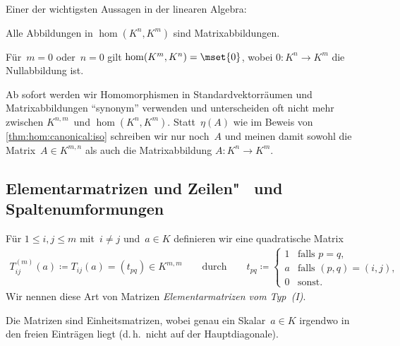 \documentclass[a4paper]{article}
\begin{document}
Einer der wichtigsten Aussagen in der linearen Algebra:

\begin{corollary}\label{cor:hommatrixiso}
    Alle Abbildungen in $\hom(K^n,K^m)$ sind Matrixabbildungen.

    Für~$m = 0$ oder~$n = 0$ gilt $\hom(K^m,K^n) = \mset{0}$, wobei $0\colon K^n \to K^m$ die Nullabbildung ist.
\end{corollary}

Ab sofort werden wir Homomorphismen in Standardvektorräumen und Matrixabbildungen "`synonym"' verwenden und unterscheiden oft nicht mehr zwischen $K^{n,m}$~und $\hom(K^n,K^m)$. Statt~$\eta(A)$ wie im Beweis von \cref{thm:hom:canonical:iso} schreiben wir nur noch~$A$ und meinen damit sowohl die Matrix~$A \in K^{m,n}$ als auch die Matrixabbildung $A\colon K^n \to K^m$.

\subsection{Elementarmatrizen und Zeilen"~ und Spaltenumformungen}

\begin{definition}
    Für $1 \leq i,j \leq m$ mit~$i \neq j$ und~$a \in K$ definieren wir eine quadratische Matrix
    \begin{gather*}
        T_{ij}^{(m)}(a) \coloneqq T_{ij}(a) = (t_{pq}) \in K^{m,m} \qquad\text{durch}\qquad t_{pq} \coloneqq \begin{cases}
            1 & \text{falls } p = q,         \\
            a & \text{falls } (p,q) = (i,j), \\
            0 & \text{sonst}.
        \end{cases}
    \end{gather*}
    Wir nennen diese Art von Matrizen \emph{Elementarmatrizen vom Typ~(I)}.
\end{definition}

Die Matrizen sind Einheitsmatrizen, wobei genau ein Skalar~$a \in K$ irgendwo in den freien Einträgen liegt (d.\,h.\ nicht auf der Hauptdiagonale).
\end{document}
